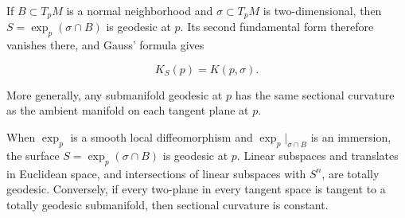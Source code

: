 \begin{remark}
  \label{rem:dc-ch6-2-9-interpretation}
  \leanok
  \sketch
  If $B\subset T_pM$ is a normal neighborhood and $\sigma\subset T_pM$ is
  two-dimensional, then $S=\exp_p(\sigma\cap B)$ is geodesic at $p$. Its
  second fundamental form therefore vanishes there, and Gauss' formula gives

  $$
  K_S(p)=K(p,\sigma).
  $$

  More generally, any submanifold geodesic at $p$ has the same sectional
  curvature as the ambient manifold on each tangent plane at $p$.
\end{remark}

\begin{remark}
  \label{rem:dc-ch6-2-9-exp-surface}
  \notready
  \sketch
  When $\exp_p$ is a smooth local diffeomorphism and
  $\exp_p|_{\sigma\cap B}$ is an immersion, the surface
  $S=\exp_p(\sigma\cap B)$ is geodesic at $p$. Linear subspaces and translates
  in Euclidean space, and intersections of linear subspaces with $S^n$, are
  totally geodesic. Conversely, if every two-plane in every tangent space is
  tangent to a totally geodesic submanifold, then sectional curvature is
  constant.
\end{remark}


